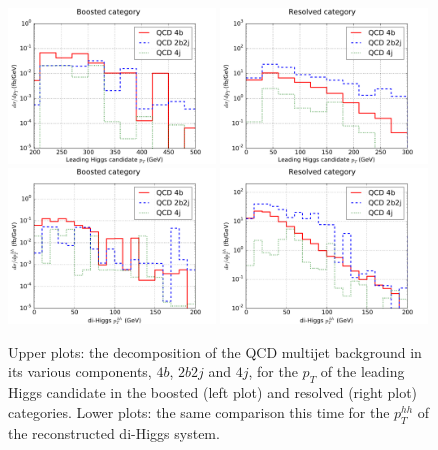 \begin{figure}[t]
\begin{center}
  \includegraphics[width=0.49\textwidth]{plots/pt_H0_C2_boost_back.pdf}
  \includegraphics[width=0.49\textwidth]{plots/pt_H0_C2_res_back.pdf}
  \includegraphics[width=0.49\textwidth]{plots/pt_HH_C2_boost_back.pdf}
  \includegraphics[width=0.49\textwidth]{plots/pt_HH_C2_res_back.pdf}
  \caption{\small
    Upper plots: the decomposition of the QCD multijet background in its various
    components, $4b$, $2b2j$ and $4j$, for the $p_T$ of the leading
    Higgs candidate in the boosted (left plot) and resolved (right plot) categories.
    Lower plots: the same comparison this time for the $p_T^{hh}$ of the
    reconstructed di-Higgs system.
}
\label{fig:histoBack}
\end{center}
\end{figure}

